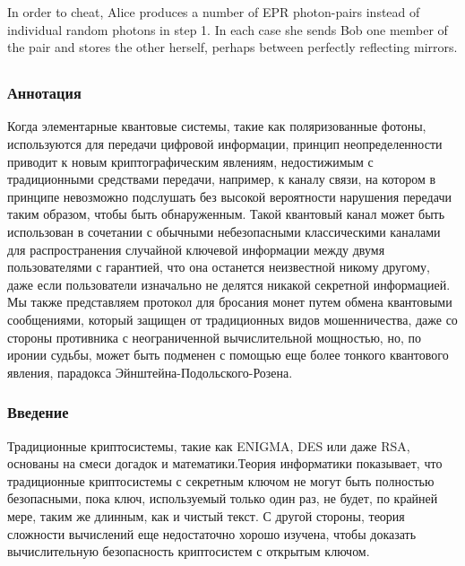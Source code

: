 In order to cheat, Alice produces a number of EPR photon-pairs instead of individual random pho­tons in step 1. In each case she sends Bob one mem­ber of the pair and stores the other herself, per­haps between perfectly reflecting mirrors. 


\subsection{\trnas}

\subsubsection*{Аннотация}
Когда элементарные квантовые системы, такие как поляризованные фотоны, используются для передачи цифровой информации, принцип неопределенности приводит к новым криптографическим явлениям, недостижимым с традиционными средствами передачи, например, к каналу связи, на котором в принципе невозможно подслушать без высокой вероятности нарушения передачи таким образом, чтобы быть обнаруженным. Такой квантовый канал может быть использован в сочетании с обычными небезопасными классическими каналами для распространения случайной ключевой информации между двумя пользователями с гарантией, что она останется неизвестной никому другому, даже если пользователи изначально не делятся никакой секретной информацией. Мы также представляем протокол для бросания монет путем обмена квантовыми сообщениями, который защищен от традиционных видов мошенничества, даже со стороны противника с неограниченной вычислительной мощностью, но, по иронии судьбы, может быть подменен с помощью еще более тонкого квантового явления, парадокса Эйнштейна-Подольского-Розена.

\subsubsection{Введение}

­­Традиционные криптосистемы, такие как ENIGMA, DES или даже RSA, основаны на смеси догадок и математики.Теория информатики показывает, что традиционные криптосистемы с секретным ключом не могут быть полностью безопасными, пока ключ, используемый только один раз, не будет, по крайней мере, таким же длинным, как и чистый текст. С другой стороны, теория сложности вычислений еще недостаточно хорошо изучена, чтобы доказать вычислительную безопасность криптосистем с открытым ключом.

